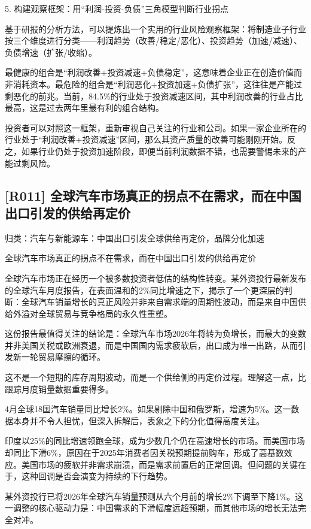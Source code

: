 \documentclass[11pt]{ctexart}
\begin{document}
5. 构建观察框架：用“利润-投资-负债”三角模型判断行业拐点

基于研报的分析方法，可以提炼出一个实用的行业风险观察框架：将制造业子行业按三个维度进行分类——利润趋势（改善/稳定/恶化）、投资趋势（加速/减速）、负债增速（扩张/收缩）。

最健康的组合是“利润改善+投资减速+负债稳定”，这意味着企业正在创造价值而非消耗资本。最危险的组合是“利润恶化+投资加速+负债扩张”，这往往是产能过剩恶化的前兆。当前，84.5\%的行业处于投资减速区间，其中利润改善的行业占比最高，这是过去两年里最有利的组合结构。

投资者可以对照这一框架，重新审视自己关注的行业和公司。如果一家企业所在的行业处于“利润改善+投资减速”区间，那么其资产质量的改善可能刚刚开始。反之，如果行业仍处于投资加速阶段，即便当前利润数据不错，也需要警惕未来的产能过剩风险。

\subsection{[R011] 全球汽车市场真正的拐点不在需求，而在中国出口引发的供给再定价}
{\small\color{refgray}归类：汽车与新能源车：中国出口引发全球供给再定价，品牌分化加速}

全球汽车市场真正的拐点不在需求，而在中国出口引发的供给再定价

全球汽车市场正在经历一个被多数投资者低估的结构性转变。某外资投行最新发布的全球汽车月度报告，在表面温和的2\%同比增速之下，揭示了一个更深层的判断：全球汽车销量增长的真正风险并非来自需求端的周期性波动，而是来自中国供给外溢对全球贸易与竞争格局的永久性重塑。

这份报告最值得关注的结论是：全球汽车市场2026年将转为负增长，而最大的变数并非美国关税或欧洲衰退，而是中国国内需求疲软后，出口成为唯一出路，从而引发新一轮贸易摩擦的循环。

这不是一个短期的库存周期波动，而是一个供给侧的再定价过程。理解这一点，比跟踪月度销量数据重要得多。

4月全球18国汽车销量同比增长2\%。如果剔除中国和俄罗斯，增速为5\%。这一数据本身并不令人担忧，但深入拆解后，表象之下的分化值得高度关注。

印度以25\%的同比增速领跑全球，成为少数几个仍在高速增长的市场。而美国市场却同比下滑6\%，原因在于2025年消费者因关税预期提前购车，形成了高基数效应。美国市场的疲软并非需求崩溃，而是需求前置后的正常回调。但问题的关键在于，这种回调是否会演变为持续的下行趋势。

某外资投行已将2026年全球汽车销量预测从六个月前的增长2\%下调至下降1\%。这一调整的核心驱动力是：中国需求的下滑幅度远超预期，而其他市场的增长无法完全对冲。
\end{document}
